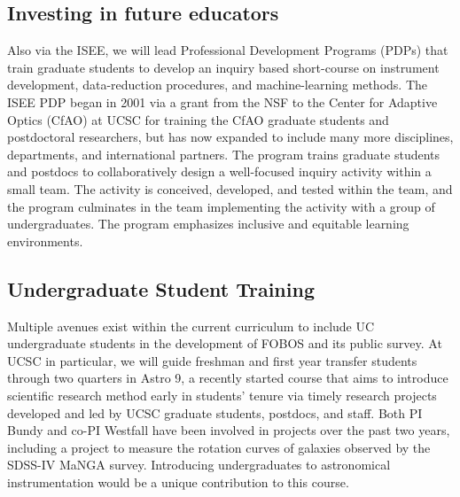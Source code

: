 \documentclass[oneside,11pt]{amsart}
\newcommand{\comment}[2][todo]{{\color{#1}[[{\bf #2}]]}}
\begin{document}
\subsection{Investing in future educators}

Also via the ISEE, we will lead Professional Development Programs (PDPs)
that train graduate students to develop an inquiry based short-course on
instrument development, data-reduction procedures, and machine-learning
methods.  The ISEE PDP began in 2001 via a grant from the NSF to the
Center for Adaptive Optics (CfAO) at UCSC for training the CfAO graduate
students and postdoctoral researchers, but has now expanded to include
many more disciplines, departments, and international partners.  The
program trains graduate students and postdocs to collaboratively design
a well-focused inquiry activity within a small team.  The activity is
conceived, developed, and tested within the team, and the program
culminates in the team implementing the activity with a group of
undergraduates.  The program emphasizes inclusive and equitable learning
environments.


% 
% 
% 
% 
% 
% 
% 
% 
% 
% 
% 


\subsection{Undergraduate Student Training}

Multiple avenues exist within the current curriculum to include UC
undergraduate students in the development of FOBOS and its public
survey.  At UCSC in particular, we will guide freshman and first year
transfer students through two quarters in Astro 9, a recently started
course that aims to introduce scientific research method early in
students' tenure via timely research projects developed and led by UCSC
graduate students, postdocs, and staff.  Both PI Bundy and co-PI
Westfall have been involved in projects over the past two years,
including a project to measure the rotation curves of galaxies observed
by the SDSS-IV MaNGA survey.  Introducing undergraduates to astronomical
instrumentation would be a unique contribution to this course.
\end{document}
